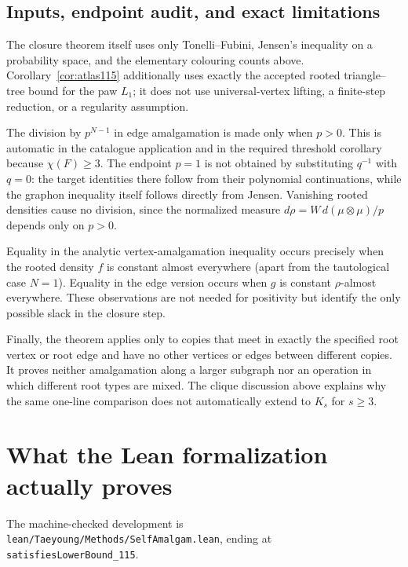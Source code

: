 \documentclass[11pt]{article}
\begin{document}
\subsection{Inputs, endpoint audit, and exact limitations}

The closure theorem itself uses only Tonelli--Fubini, Jensen's
inequality on a probability space, and the elementary colouring counts
above.  Corollary~\ref{cor:atlas115} additionally uses exactly the
accepted rooted triangle--tree bound for the paw $L_1$; it does not use
universal-vertex lifting, a finite-step reduction, or a regularity
assumption.

The division by $p^{N-1}$ in edge amalgamation is made only when
$p>0$.  This is automatic in the catalogue application and in the
required threshold corollary because $\chi(F)\ge3$.  The endpoint
$p=1$ is not obtained by substituting $q^{-1}$ with $q=0$: the target
identities there follow from their polynomial continuations, while the
graphon inequality itself follows directly from Jensen.  Vanishing
rooted densities cause no division, since the normalized measure
$d\rho=W\,d(\mu\otimes\mu)/p$ depends only on $p>0$.

Equality in the analytic vertex-amalgamation inequality occurs precisely
when the rooted density $f$ is constant almost everywhere (apart from
the tautological case $N=1$).  Equality in the edge version occurs when
$g$ is constant $\rho$-almost everywhere.  These observations are not
needed for positivity but identify the only possible slack in the
closure step.

Finally, the theorem applies only to copies that meet in exactly the
specified root vertex or root edge and have no other vertices or edges
between different copies.  It proves neither amalgamation along a
larger subgraph nor an operation in which different root types are mixed.
The clique discussion above explains why the same one-line comparison
does not automatically extend to $K_s$ for $s\ge3$.

\section{What the Lean formalization actually proves}

The machine-checked development is
\texttt{lean/Taeyoung/Methods/SelfAmalgam.lean}, ending at
\texttt{satisfiesLowerBound\_115}.
\end{document}
